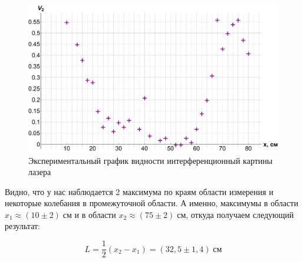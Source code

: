 \documentclass[12pt]{kiarticle}
\begin{document}
%
%



\begin{figure}[h!]
	\centering
	\includegraphics[width=0.9\linewidth]{V2.pdf}
	\caption{Экспериментальный график видности интерференционный картины лазера}
	\label{V2}
\end{figure}

Видно, что у нас наблюдается 2 максимума по краям области измерения и некоторые колебания в промежуточной области. А именно, максимумы в области $ x_1 \approx (10 \pm 2) \; см $ и в области $ x_2 \approx (75 \pm 2) \; см $, откуда получаем следующий результат:

\begin{equation}\label{}
L = \dfrac{1}{2} (x_2 - x_1) = (32,5 \pm 1,4) \; см
\end{equation}
\end{document}
